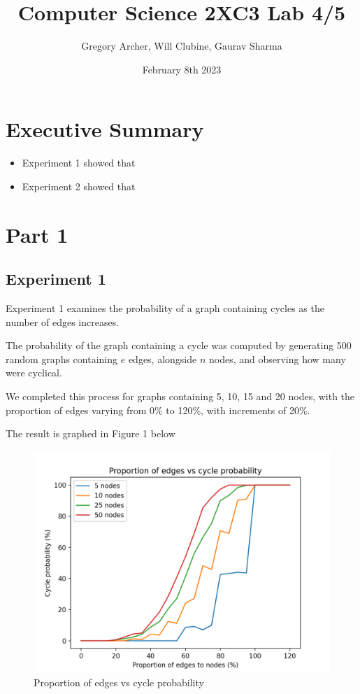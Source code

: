 \documentclass[titlepage]{article}
\title{Computer Science 2XC3 Lab 4/5}
\author{Gregory Archer, Will Clubine, Gaurav Sharma}
\date{February 8th 2023}
\begin{document}
\maketitle
\tableofcontents
\listoffigures

\newpage

\section{Executive Summary}
\begin{itemize}
    \item Experiment 1 showed that
    \item Experiment 2 showed that
\end{itemize}

\section{Part 1}

\subsection{Experiment 1}

Experiment 1 examines the probability of a graph containing cycles as the number of edges increases.

The probability of the graph containing a cycle was computed by generating 500 random graphs containing $e$ edges, alongside $n$ nodes, and observing how many were cyclical.

We completed this process for graphs containing 5, 10, 15 and 20 nodes, with the proportion of edges varying from 0\% to 120\%, with increments of 20\%.

The result is graphed in Figure 1 below

\begin{figure}[H]
    \centering
    \includegraphics[width=0.8\linewidth]{experiment_1.png}
    \caption{Proportion of edges vs cycle probability}
    \label{fig:edges_vs_cycle}
\end{figure}
\end{document}
